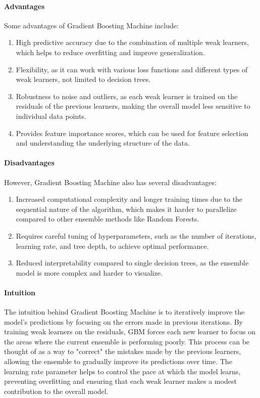 \documentclass[12pt]{article}
\begin{document}
\paragraph{Advantages}
Some advantages of Gradient Boosting Machine include:
\begin{enumerate}
\item High predictive accuracy due to the combination of multiple weak learners, which helps to reduce overfitting and improve generalization.
\item Flexibility, as it can work with various loss functions and different types of weak learners, not limited to decision trees.
\item Robustness to noise and outliers, as each weak learner is trained on the residuals of the previous learners, making the overall model less sensitive to individual data points.
\item Provides feature importance scores, which can be used for feature selection and understanding the underlying structure of the data.
\end{enumerate}

\paragraph{Disadvantages}
However, Gradient Boosting Machine also has several disadvantages:
\begin{enumerate}
\item Increased computational complexity and longer training times due to the sequential nature of the algorithm, which makes it harder to parallelize compared to other ensemble methods like Random Forests.
\item Requires careful tuning of hyperparameters, such as the number of iterations, learning rate, and tree depth, to achieve optimal performance.
\item Reduced interpretability compared to single decision trees, as the ensemble model is more complex and harder to visualize.
\end{enumerate}

\paragraph{Intuition}
The intuition behind Gradient Boosting Machine is to iteratively improve the model's predictions by focusing on the errors made in previous iterations. By training weak learners on the residuals, GBM forces each new learner to focus on the areas where the current ensemble is performing poorly. This process can be thought of as a way to "correct" the mistakes made by the previous learners, allowing the ensemble to gradually improve its predictions over time. The learning rate parameter helps to control the pace at which the model learns, preventing overfitting and ensuring that each weak learner makes a modest contribution to the overall model.
\end{document}
